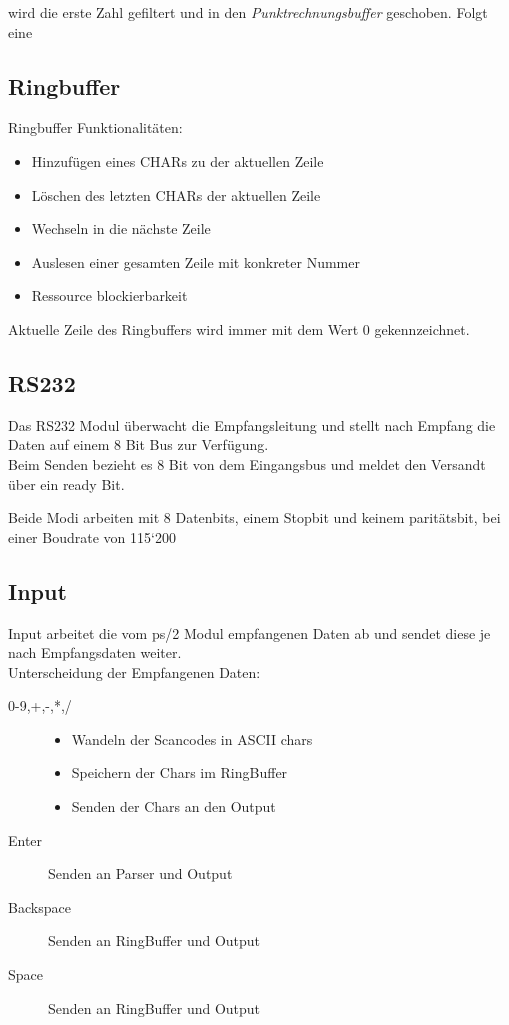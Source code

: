 wird die erste Zahl gefiltert und in den \textit{Punktrechnungsbuffer} geschoben.
Folgt eine
\subsection{Ringbuffer}
Ringbuffer Funktionalitäten:
\begin{itemize}
 \item Hinzufügen eines CHARs zu der aktuellen Zeile
 \item Löschen des letzten CHARs der aktuellen Zeile
 \item Wechseln in die nächste Zeile
 \item Auslesen einer gesamten Zeile mit konkreter Nummer
 \item Ressource blockierbarkeit
\end{itemize}
Aktuelle Zeile des Ringbuffers wird immer mit dem Wert 0 gekennzeichnet.

\subsection{RS232}
Das RS232 Modul überwacht die Empfangsleitung und stellt nach Empfang die Daten auf einem 
8 Bit Bus zur Verfügung.\\
Beim Senden bezieht es 8 Bit von dem Eingangsbus und meldet den Versandt über ein ready Bit.

Beide Modi arbeiten mit 8 Datenbits, einem Stopbit und keinem paritätsbit, bei einer
Boudrate von 115`200
\subsection{Input}
Input arbeitet die vom ps/2 Modul empfangenen Daten ab und sendet diese je nach Empfangsdaten weiter.\\
Unterscheidung der Empfangenen Daten:
\begin{description}
 \item[0-9,+,-,*,/] 
	\begin{itemize}
		\item Wandeln der Scancodes in ASCII chars 
		\item Speichern der Chars im RingBuffer
		\item Senden der Chars an den Output
	\end{itemize}
 \item[Enter] Senden an Parser und Output
 \item[Backspace] Senden an RingBuffer und Output
 \item[Space] Senden an RingBuffer und Output
 \end{description}

